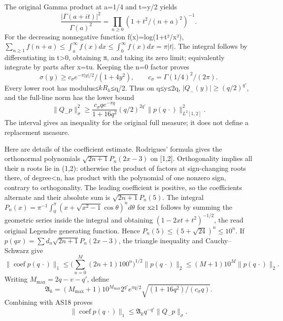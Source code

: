 \documentclass[11pt]{article}
\begin{document}
The original Gamma product at a=1/4 and t=y/2 yields \[
\frac{|\Gamma(a+it)|^2}{\Gamma(a)^2}
=\prod_{n\ge0}(1+t^2/(n+a)^2)^{-1}.
\] For the decreasing nonnegative function f(x)=log(1+t²/x²), \(\sum_{n\ge1}f(n+a)\le\int_a^\infty f(x)dx\le\int_0^\infty f(x)dx=\pi|t|\). The integral follows by differentiating in \textbar t\textbar\textgreater0, obtaining π, and taking its zero limit; equivalently integrate by parts after x=\textbar t\textbar u. Keeping the n=0 factor proves \[
\sigma(y)\ge c_\sigma e^{-\pi|y|/2}/(1+4y^2),
\qquad c_\sigma=\Gamma(1/4)^2/(2\pi).
\tag{AS17}
\] Every lower root has modulus≤\(kR_h\)≤q/2. Thus on q≤y≤2q, \(|Q_-(y)|\ge(q/2)^{q'}\), and the full-line norm has the lower bound \[
\|Q_-p\|_\sigma^2\ge
\frac{c_\sigma q e^{-\pi q}}{1+16q^2}(q/2)^{2q'}
\|p(q\,\cdot)\|_{L^2[1,2]}^2.
\tag{AS18}
\] The interval gives an inequality for the original full measure; it does not define a replacement measure.

Here are details of the coefficient estimate. Rodrigues' formula gives the orthonormal polynomials \(\sqrt{2n+1}P_n(2x-3)\) on {[}1,2{]}. Orthogonality implies all their n roots lie in (1,2): otherwise the product of factors at sign-changing roots there, of degree\textless n, has product with the polynomial of one nonzero sign, contrary to orthogonality. The leading coefficient is positive, so the coefficients alternate and their absolute sum is \(\sqrt{2n+1}P_n(5)\). The integral \(P_n(x)=\pi^{-1}\int_0^\pi(x+\sqrt{x^2-1}\cos\theta)^n d\theta\) for x≥1 follows by summing the geometric series inside the integral and obtaining \((1-2xt+t^2)^{-1/2}\), the read original Legendre generating function. Hence \(P_n(5)\le(5+\sqrt{24})^n\le10^n\). If \(p(qx)=\sum d_n\sqrt{2n+1}P_n(2x-3)\), the triangle inequality and Cauchy--Schwarz give \[
\|\operatorname{coef}p(q\,\cdot)\|_1
\le\Big(\sum_{n=0}^M(2n+1)100^n\Big)^{1/2}\|p(q\,\cdot)\|_2
\le(M+1)10^M\|p(q\,\cdot)\|_2.
\] Writing \(M_{\max}=2q-v-q'\), define \[
\mathfrak A_k=(M_{\max}+1)10^{M_{\max}}2^{q'}e^{\pi q/2}
\sqrt{(1+16q^2)/(c_\sigma q)}.
\tag{AS19}
\] Combining with AS18 proves \[
\|\operatorname{coef}p(q\,\cdot)\|_1
\le\mathfrak A_kq^{-q'}\|Q_-p\|_\sigma.
\tag{AS20}
\]
\end{document}
